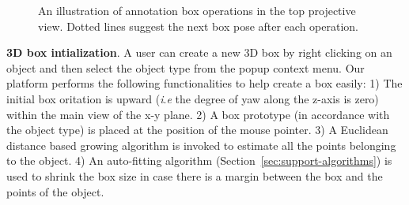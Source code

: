 \documentclass[letterpaper, 10 pt, conference]{ieeeconf}  %
\begin{document}
\begin{figure}[t]
	\centering
	\caption{An illustration of annotation box operations in the top projective view. Dotted lines suggest the next box pose after each operation.}
	\label{fig:box-mouse-edit-subview}
\end{figure}
\textbf{3D box intialization}. A user can create a new 3D box by right clicking on an object and then select the object type from the popup context menu. 
Our platform performs the following functionalities to help create a box easily:
1) The initial box oritation is upward (\textit{i}.\textit{e} the degree of yaw along the z-axis is zero) within the main view of the x-y plane.  
2) A box prototype (in accordance with the object type) is placed at the position of the mouse pointer.
3) A Euclidean distance based growing algorithm is invoked to estimate all the points belonging to the object.
4) An auto-fitting algorithm (Section~\ref{sec:support-algorithms}) is used to shrink the box size in case there is a margin between the box and the points of the object.
\end{document}
